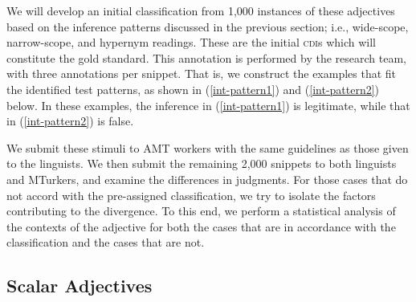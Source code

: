 \documentclass[10pt]{article}
\begin{document}
We will develop an initial classification from 1,000 instances of these adjectives based on the inference patterns discussed in the previous section; i.e., wide-scope, narrow-scope, and hypernym readings. 
These are the initial \textsc{cdi}s  which will constitute the  gold standard. This annotation is performed by the research team, with three annotations per snippet. 
That is, we construct the examples that fit the identified test patterns, as shown in (\ref{int-pattern1}) and (\ref{int-pattern2}) below. In these examples, the inference in (\ref{int-pattern1}) is legitimate, while that in (\ref{int-pattern2}) is false. 

\vspace {-3mm}

\begin{multicols}{2}

\vspace {-6mm}

\end{multicols}
\vspace {-2mm}

 \noindent We submit these stimuli to AMT workers with the same guidelines as those given to the linguists. 
 We then submit the remaining 2,000 snippets to both linguists and MTurkers, and examine the differences in judgments. For those cases that do not accord with the pre-assigned classification, we try to isolate the factors contributing to the divergence. 
 To this end, we perform a statistical analysis of the contexts of the adjective for both the cases that are in accordance with the classification and the cases that are not. 
 

\vspace {-3mm}

\subsection{\label{scalar}Scalar Adjectives}

\vspace {-3mm}
\end{document}
